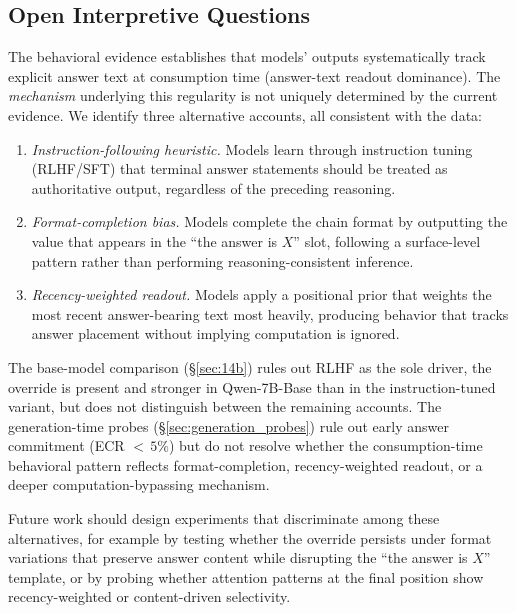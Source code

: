 \documentclass{article}
\theoremstyle{definition}
\theoremstyle{definition}
\begin{document}
\subsection{Open Interpretive Questions}
\label{sec:interpretive_questions}

The behavioral evidence establishes that models' outputs systematically
track explicit answer text at consumption time (answer-text readout
dominance). The \emph{mechanism} underlying this regularity is not
uniquely determined by the current evidence. We identify three alternative
accounts, all consistent with the data:

\begin{enumerate}[nosep]
  \item \emph{Instruction-following heuristic.} Models learn through
    instruction tuning (RLHF/SFT) that terminal answer statements should
    be treated as authoritative output, regardless of the preceding
    reasoning.
  \item \emph{Format-completion bias.} Models complete the chain
    format by outputting the value that appears in the ``the answer is
    $X$'' slot, following a surface-level pattern rather than performing
    reasoning-consistent inference.
  \item \emph{Recency-weighted readout.} Models apply a positional
    prior that weights the most recent answer-bearing text most heavily,
    producing behavior that tracks answer placement without implying
    computation is ignored.
\end{enumerate}

The base-model comparison (\S\ref{sec:14b}) rules out RLHF as the
sole driver, the override is present and stronger in Qwen-7B-Base than
in the instruction-tuned variant, but does not distinguish between the
remaining accounts. The generation-time probes (\S\ref{sec:generation_probes})
rule out early answer commitment (ECR ${<}\,5\%$) but do not resolve
whether the consumption-time behavioral pattern reflects format-completion,
recency-weighted readout, or a deeper computation-bypassing mechanism.

Future work should design experiments that discriminate among these
alternatives, for example by testing whether the override persists under
format variations that preserve answer content while disrupting the
``the answer is $X$'' template, or by probing whether attention patterns
at the final position show recency-weighted or content-driven selectivity.
\end{document}
